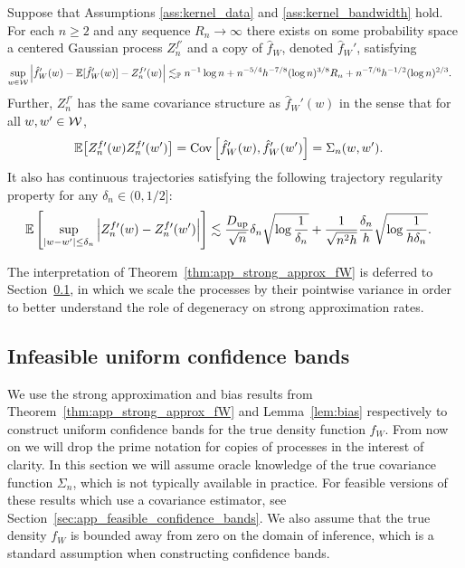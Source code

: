 \begin{theorem}
  \label{thm:app_strong_approx_fW}

  Suppose that Assumptions
  \ref{ass:kernel_data} and \ref{ass:kernel_bandwidth} hold.
  For each $n \geq 2$
  and any sequence $R_n \to \infty$
  there exists on some probability space
  a centered Gaussian process $Z_n^{f\prime}$
  and a copy of $\hat f_W$,
  denoted $\hat f_W'$,
  satisfying
  \begin{align*}
    \sup_{w \in \mathcal{W}}
    \Big|
    \hat f_W'(w) - \mathbb{E}[\hat f_W'(w)]
    - Z_n^{f\prime}(w)
    \Big|
    &\lesssim_{\mathbb{P}}
    n^{-1} \log n
    + n^{-5/4} h^{-7/8} (\log n)^{3/8} R_n
    + n^{-7/6} h^{-1/2} (\log n)^{2/3}.
  \end{align*}
  Further, $Z_n^{f\prime}$ has the same covariance
  structure as
  $\hat f_W'(w)$
  in the sense that for all
  $w, w' \in \mathcal{W}$,
  \begin{align*}
    \mathbb{E}\big[Z_n^{f\prime}(w) Z_n^{f\prime}(w')\big]
    &=
    \operatorname{Cov}\Big[
      \hat f_W'(w),
      \hat f_W'(w')
      \Big]
    = \Sigma_n(w,w').
  \end{align*}
  It also has continuous trajectories satisfying
  the following trajectory regularity property
  for any $\delta_n \in (0, 1/2]$:
  \begin{align*}
    \mathbb{E}\left[
      \sup_{|w-w'| \leq \delta_n}
      \Big|
      Z_n^{f\prime}(w)
      - Z_n^{f\prime}(w')
      \Big|
    \right]
    &\lesssim
    \frac{D_{\textup{up}}}{\sqrt n} \delta_n
    \sqrt{\log \frac{1}{\delta_n}}
    + \frac{1}{\sqrt{n^2h}}
    \frac{\delta_n}{h}
    \sqrt{\log \frac{1}{h\delta_n}}.
  \end{align*}
\end{theorem}

\begin{remark}
  The interpretation of
  Theorem~\ref{thm:app_strong_approx_fW}
  is deferred to
  Section~\ref{sec:infeasible_confidence_bands},
  in which we scale the processes by their pointwise variance
  in order to better understand the role of degeneracy
  on strong approximation rates.
\end{remark}

\subsection{Infeasible uniform confidence bands}
\label{sec:infeasible_confidence_bands}

We use the strong approximation and bias results
from Theorem~\ref{thm:app_strong_approx_fW}
and Lemma~\ref{lem:bias}
respectively to construct uniform confidence bands for
the true density function $f_W$.
From now on we will drop the prime notation for copies of processes
in the interest of clarity.
In this section we will assume oracle knowledge of the true
covariance function $\Sigma_n$,
which is not typically available in practice.
For feasible versions of these results which use a covariance estimator,
see Section~\ref{sec:app_feasible_confidence_bands}.
We also assume that the true density $f_W$
is bounded away from zero on the domain of inference,
which is a standard assumption when constructing confidence bands.


